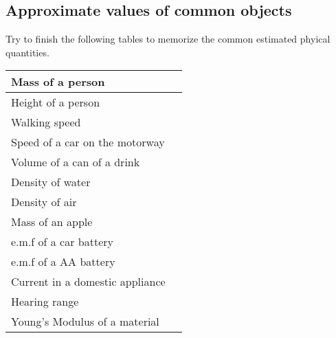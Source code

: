 \documentclass[12pt,a4paper]{tufte-handout}
\begin{document}
\subsection*{Approximate values of common objects}
Try to finish the following tables to memorize the common estimated phyical quantities.
\begin{table}[t]
\begin{tabular}{|l|l|}
\hline
Mass of a person                             & \uline{\hspace{1 in}} \\ \hline
Height of a person                           & \uline{\hspace{1 in}} \\ \hline
Walking speed                          	   & \uline{\hspace{1 in}} \\ \hline
Speed of a car on the motorway 		   & \uline{\hspace{1 in}} \\ \hline
Volume of a can of a drink                   & \uline{\hspace{1 in}} \\ \hline
Density of water                             & \uline{\hspace{1 in}} \\ \hline
Density of air                               & \uline{\hspace{1 in}} \\ \hline
Mass of an apple                             & \uline{\hspace{1 in}} \\ \hline
e.m.f of a car battery                       & \uline{\hspace{1 in}} \\ \hline
e.m.f of a AA battery                        & \uline{\hspace{1 in}} \\ \hline
Current in a domestic appliance              & \uline{\hspace{1 in}} \\ \hline
Hearing range                                & \uline{\hspace{1 in}} \\ \hline
Young’s Modulus of a material                & \uline{\hspace{1 in}} \\ \hline
\end{tabular}
\end{table}
\end{document}
